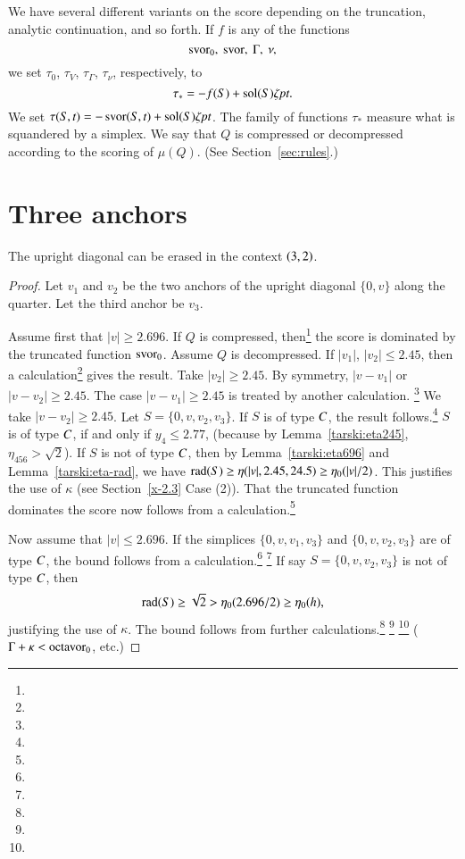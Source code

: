 We have several different variants on the score depending on the
truncation, analytic continuation, and so forth.  If $f$ is any of the
functions
    $$\svor_0,\ \svor,\ \Gamma, \ \nu,$$
we set $\tau_{0}$, $\tau_V$, $\tau_\Gamma$,
$\tau_\nu$, respectively,
to
    $$\tau_* = -f(S) +\operatorname{sol}(S)\zeta\hbox{\it pt}.$$
We set
    $\tau(S,t) = -\operatorname{svor}(S,t)+\operatorname{sol}(S)\zeta\hbox{\it pt}$.
The family of functions $\tau_*$ measure what is squandered by a
simplex.  We say that $Q$ is compressed or decompressed 
according to the scoring of $\mu(Q)$.  (See
Section~\ref{sec:rules}.)




\section{Three anchors} %


\begin{lemma}
The upright diagonal can be erased in the context $\relax(3,2)$.
\end{lemma}


\begin{proof}
Let $v_1$ and $v_2$ be the two anchors of the upright diagonal $\{0,v\}$
along the quarter. Let the third anchor be $v_3$.

Assume first that $|v|\ge 2.696$. If $Q$ is compressed,
then\footnote{} %
the score is dominated by the truncated
function $\operatorname{svor}_0$.  Assume $Q$ is decompressed. If $|v_1|$,
$|v_2|\le 2.45$, then a calculation\footnote{} %
gives the result. Take $|v_2|\ge
2.45$.  By symmetry, $|v-v_1|$ or $|v-v_2|\ge 2.45$. The case
$|v-v_1|\ge2.45$ is treated by another calculation.%
\footnote{} %
We take
$|v-v_2|\ge2.45$. Let $S=\{0,v,v_2,v_3\}$. If $S$ is of type $C$,
the result follows.\footnote{} %
$S$ is of type $C$, if and only if $y_4\le 2.77$, (because
by Lemma~\ref{tarski:eta245}, $\eta_{456}>\sqrt2$).
If $S$ is  not of type $C$, then by Lemma~\ref{tarski:eta696} and
Lemma~\ref{tarski:eta-rad},
we have $\operatorname{rad}(S) \ge\eta(|v|,2.45,24.5)\ge \eta_0(|v|/2)$.
This justifies the use of $\kappa$ (see Section~\ref{x-2.3}
Case (2)). That the truncated function dominates the score now
follows from a calculation.\footnote{} %

Now assume that $|v|\le 2.696$. If the simplices $\{0,v,v_1,v_3\}$
and $\{0,v,v_2,v_3\}$ are of type $C$, the bound follows from a
calculation.\footnote{} %
\footnote{} %
If say  $S=\{0,v,v_2,v_3\}$ is not of type $C$,
then
    $$\operatorname{rad}(S)\ge\sqrt2>  \eta_0(2.696/2)\ge\eta_0(h),$$
justifying the use of $\kappa$. The bound follows from further
calculations.\footnote{} %
\footnote{} %
\footnote{} %
($\Gamma+\kappa <\operatorname{octavor}_0$,
etc.)
\end{proof}

